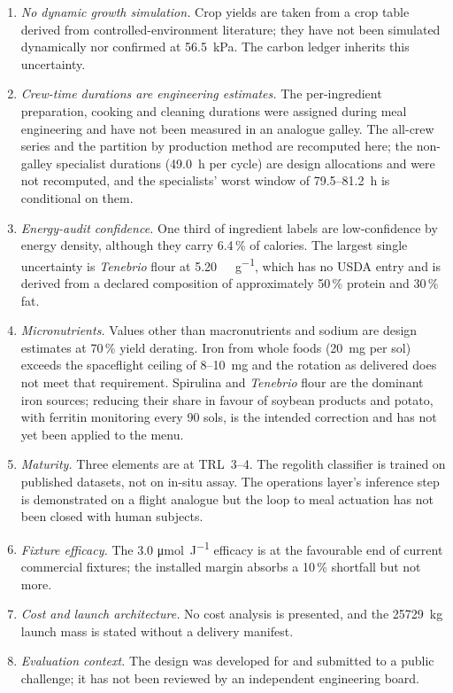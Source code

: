 \documentclass[11pt,a4paper,3p,authoryear]{elsarticle}
\begin{document}
\begin{enumerate}
\item \emph{No dynamic growth simulation.} Crop yields are taken from a crop table derived from controlled-environment literature; they have not been simulated dynamically nor confirmed at \SI{56.5}{\kilo\pascal}. The carbon ledger inherits this uncertainty.
\item \emph{Crew-time durations are engineering estimates.} The per-ingredient preparation, cooking and cleaning durations were assigned during meal engineering and have not been measured in an analogue galley. The all-crew series and the partition by production method are recomputed here; the non-galley specialist durations (\SI{49.0}{\hour} per cycle) are design allocations and were not recomputed, and the specialists' worst window of 79.5--\SI{81.2}{\hour} is conditional on them.
\item \emph{Energy-audit confidence.} One third of ingredient labels are low-confidence by energy density, although they carry 6.4\,\% of calories. The largest single uncertainty is \emph{Tenebrio} flour at \SI{5.20}{\kilo\calorie\per\gram}, which has no USDA entry and is derived from a declared composition of approximately 50\,\% protein and 30\,\% fat.
\item \emph{Micronutrients.} Values other than macronutrients and sodium are design estimates at 70\,\% yield derating. Iron from whole foods (\SI{20}{\milli\gram} per sol) exceeds the spaceflight ceiling of 8--\SI{10}{\milli\gram} and the rotation as delivered does not meet that requirement. Spirulina and \emph{Tenebrio} flour are the dominant iron sources; reducing their share in favour of soybean products and potato, with ferritin monitoring every 90 sols, is the intended correction and has not yet been applied to the menu.
\item \emph{Maturity.} Three elements are at TRL~3--4. The regolith classifier is trained on published datasets, not on in-situ assay. The operations layer's inference step is demonstrated on a flight analogue but the loop to meal actuation has not been closed with human subjects.
\item \emph{Fixture efficacy.} The 3.0 \si{\micro\mole\per\joule} efficacy is at the favourable end of current commercial fixtures; the installed margin absorbs a 10\,\% shortfall but not more.
\item \emph{Cost and launch architecture.} No cost analysis is presented, and the \SI{25729}{\kilo\gram} launch mass is stated without a delivery manifest.
\item \emph{Evaluation context.} The design was developed for and submitted to a public challenge; it has not been reviewed by an independent engineering board.
\end{enumerate}
\end{document}
